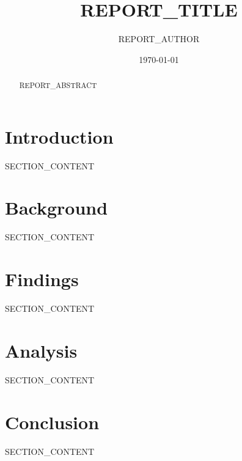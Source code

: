 \documentclass[a4paper,11pt]{article}
\title{REPORT\_TITLE}
\author{REPORT\_AUTHOR}
\date{\today}
\begin{document}
\maketitle
\thispagestyle{empty}

\begin{abstract}
REPORT\_ABSTRACT
\end{abstract}

\newpage
\tableofcontents
\newpage


\section{Introduction}
SECTION\_CONTENT

\section{Background}
SECTION\_CONTENT

\section{Findings}
SECTION\_CONTENT

\section{Analysis}
SECTION\_CONTENT

\section{Conclusion}
SECTION\_CONTENT

\end{document}
